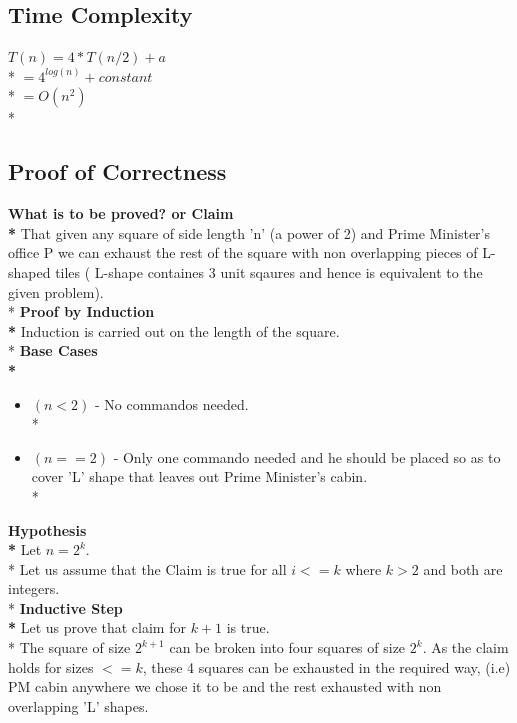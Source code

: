 \documentclass{article}
\begin{document}
\begin{itemize}
\subsection{Time Complexity}
\begin{center}
$ T(n) = 4*T(n/2) + a $ \\*
$ = 4^{log(n)} + constant $ \\*
$ = O(n^2) $ \\*
\end{center}
\subsection{Proof of Correctness}
{\bf What is to be proved? or Claim \\*}
That given any square of side length 'n' (a power of 2)  and Prime Minister's office P we can exhaust the rest of the square with non overlapping pieces of L-shaped tiles ( L-shape containes 3 unit sqaures and hence is equivalent to the given problem).  \\*
{\bf Proof by Induction \\*}
Induction is carried out on the length of the square. \\*
{\bf Base Cases \\*}
\begin{itemize}
\item $(n<2)$ - No commandos needed. \\*
\item $(n==2)$ - Only one commando needed and he should be placed so as to cover 'L' shape that leaves out Prime Minister's cabin. \\*
\end{itemize}
{\bf Hypothesis \\*}
Let $ n = 2^{k} $. \\*
Let us assume that the Claim is true for all $i<=k$ where $k>2$ and both are integers. \\*
{\bf Inductive Step \\*}
Let us prove that claim for $ k+1 $ is true. \\*
The square of size $2^{k+1}$ can be broken into four squares of size $2^{k}$. As the claim holds for sizes $<=k$, these 4 squares can be exhausted in the required way, (i.e) PM cabin anywhere we chose it to be and the rest exhausted with non overlapping 'L' shapes. 
\end{itemize}
\end{document}
